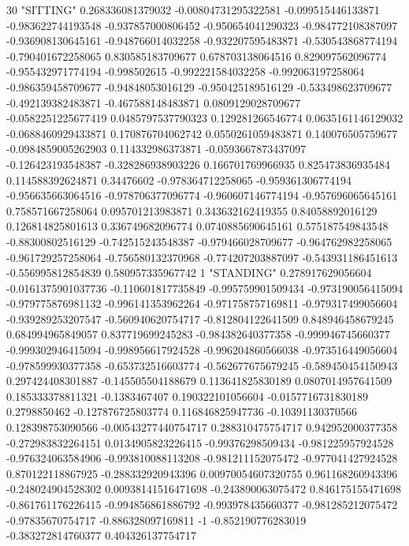 30 "SITTING" 0.268336081379032 -0.00804731295322581 -0.099515446133871 -0.983622744193548 -0.937857000806452 -0.950654041290323 -0.984772108387097 -0.936908130645161 -0.948766014032258 -0.932207595483871 -0.530543868774194 -0.790401672258065 0.830585183709677 0.678703138064516 0.829097562096774 -0.955432971774194 -0.998502615 -0.992221584032258 -0.992063197258064 -0.986359458709677 -0.94848053016129 -0.950425189516129 -0.533498623709677 -0.492139382483871 -0.467588148483871 0.0809129028709677 -0.0582251225677419 0.0485797537790323 0.129281266546774 0.0635161146129032 -0.0688460929433871 0.170876704062742 0.0550261059483871 0.140076505759677 -0.0984859005262903 0.114332986373871 -0.0593667873437097 -0.126423193548387 -0.328286938903226 0.166701769966935 0.825473836935484 0.114588392624871 0.34476602 -0.978364712258065 -0.959361306774194 -0.956635663064516 -0.978706377096774 -0.960607146774194 -0.957696065645161 0.758571667258064 0.095701213983871 0.343632162419355 0.84058892016129 0.126814825801613 0.336749682096774 0.0740885690645161 0.575187549843548 -0.88300802516129 -0.742515243548387 -0.979466028709677 -0.964762982258065 -0.961729257258064 -0.756580132370968 -0.774207203887097 -0.543931186451613 -0.556995812854839 0.580957335967742
1 "STANDING" 0.278917629056604 -0.0161375901037736 -0.110601817735849 -0.995759901509434 -0.973190056415094 -0.979775876981132 -0.996141353962264 -0.971758757169811 -0.979317499056604 -0.939289253207547 -0.560940620754717 -0.812804122641509 0.848946458679245 0.684994965849057 0.837719699245283 -0.984382640377358 -0.999946745660377 -0.999302946415094 -0.998956617924528 -0.996204860566038 -0.973516449056604 -0.978599930377358 -0.653732516603774 -0.562677675679245 -0.589450454150943 0.297424408301887 -0.145505504188679 0.113641825830189 0.0807014957641509 0.185333378811321 -0.1383467407 0.190322101056604 -0.0157716731830189 0.2798850462 -0.127876725803774 0.116846825947736 -0.10391130370566 0.128398753090566 -0.00543277440754717 0.288310475754717 0.942952000377358 -0.272983832264151 0.0134905823226415 -0.99376298509434 -0.981225957924528 -0.976324063584906 -0.993810088113208 -0.981211152075472 -0.977041427924528 0.870122118867925 -0.288332920943396 0.00970054607320755 0.961168260943396 -0.248024904528302 0.00938141516471698 -0.243890063075472 0.846175155471698 -0.861761176226415 -0.994856861886792 -0.993978435660377 -0.981285212075472 -0.97835670754717 -0.886328097169811 -1 -0.852190776283019 -0.383272814760377 0.404326137754717
